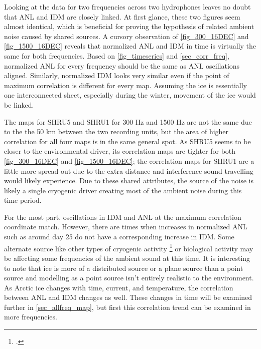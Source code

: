 Looking at the data for two frequencies across two hydrophones leaves no doubt that ANL and IDM are closely linked. At first glance, these two figures seem almost identical, which is beneficial for proving the hypothesis of related ambient noise caused by shared sources. A cursory observation of \autoref{fig_300_16DEC} and \autoref{fig_1500_16DEC} reveals that normalized ANL and IDM in time is virtually the same for both frequencies. Based on \autoref{fig_timeseries} and \autoref{sec_corr_freq}, normalized ANL for every frequency should be the same as ANL oscillations aligned. Similarly, normalized IDM looks very similar even if the point of maximum correlation is different for every map. Assuming the ice is essentially one interconnected sheet, especially during the winter, movement of the ice would be linked.  


The maps for SHRU5 and SHRU1 for 300 Hz and 1500 Hz are not the same due to the the 50 km between the two recording units, but the area of higher correlation for all four maps is in the same general spot. As SHRU5 seems to be closer to the environmental driver, its correlation maps are tighter for both \autoref{fig_300_16DEC} and \autoref{fig_1500_16DEC}; the correlation maps for SHRU1 are a little more spread out due to the extra distance and interference sound travelling would likely experience. Due to these shared attributes, the source of the noise is likely a single cryogenic driver creating most of the ambient noise during this time period. 

For the most part, oscillations in IDM and ANL at the maximum correlation coordinate match. However, there are times when increases in normalized ANL such as around day 25 do not have a corresponding increase in IDM. Some alternate source like other types of cryogenic activity \footcite[]{collins2019acoustic} or biological activity may be affecting some frequencies of the ambient sound at this time. It is interesting to note that ice is more of a distributed source or a plane source than a point source and modelling as a point source isn't entirely realistic to the environment. As Arctic ice changes with time, current, and temperature, the correlation between ANL and IDM changes as well. These changes in time will be examined further in \autoref{sec_allfreq_map}, but first this correlation trend can be examined in more frequencies.


